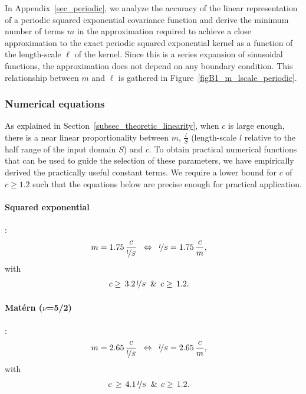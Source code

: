 In Appendix~\ref{sec_periodic}, we analyze the accuracy of the linear representation of a periodic squared exponential covariance function and derive the minimum number of terms $m$ in the approximation required to achieve a close approximation to the exact periodic squared exponential kernel as a function of the length-scale $\ell$ of the kernel. Since this is a series expansion of sinusoidal functions, the approximation does not depend on any boundary condition. This relationship between $m$ and $\ell$ is gathered in Figure~\ref{figB1_m_lscale_periodic}.


\subsubsection{Numerical equations}
\label{sec_num_equations}

As explained in Section~\ref{subsec_theoretic_linearity}, when $c$ is large enough, there is a near linear proportionality between $m$, $\frac{l}{S}$ (length-scale $l$ relative to the half range of the input domain $S$) and $c$. To obtain practical numerical functions that can be used to guide the selection of these parameters, we have empirically derived the practically useful constant terms. We require a lower bound for $c$ of $c \geq 1.2$ such that the equations below are precise enough for practical application.


\paragraph*{Squared exponential}:
%
\begin{align}\label{eq_m_l_QE}
&m= 1.75 \, \frac{c}{\nicefrac{l}{S}} \;\; \Leftrightarrow \;\; \nicefrac{l}{S}= 1.75 \, \frac{c}{m},
\end{align}
%
with
%
\begin{align}\label{eq_c_vs_l_QE}
&c \geq \, 3.2 \, \nicefrac{l}{S} \;\; \& \;\, c \geq \, 1.2 .
\end{align}

\paragraph*{Mat\'ern ($\nu$=5/2)}:
%
\begin{align}\label{eq_m_l_mat52}
&m= 2.65 \, \frac{c}{\nicefrac{l}{S}} \;\; \Leftrightarrow \;\; \nicefrac{l}{S}= 2.65 \, \frac{c}{m},
\end{align}
%
with
%
\begin{align}\label{eq_c_vs_l_mat52}
&c \, \geq \, 4.1 \, \nicefrac{l}{S} \;\; \& \;\, c \geq \, 1.2 .
\end{align}


